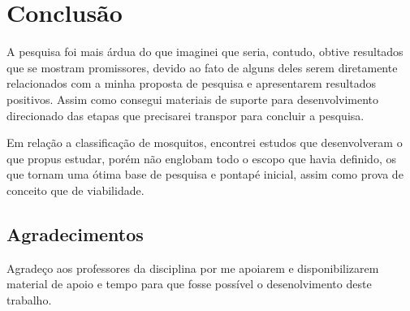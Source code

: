\documentclass{article}
\begin{document}
\section{Conclusão}
A pesquisa foi mais árdua do que imaginei que seria, contudo, obtive resultados que se mostram promissores, devido ao fato de alguns deles serem diretamente relacionados com a minha proposta de pesquisa e apresentarem resultados positivos. Assim como consegui materiais de suporte para desenvolvimento direcionado das etapas que precisarei transpor para concluir a pesquisa.

Em relação a classificação de mosquitos, encontrei estudos que desenvolveram o que propus estudar, porém não englobam todo o escopo que havia definido, os que tornam uma ótima base de pesquisa e pontapé inicial, assim como prova de conceito que de viabilidade. 

\subsection{Agradecimentos}
Agradeço aos professores da disciplina por me apoiarem e disponibilizarem material de apoio e tempo para que fosse possível o desenolvimento deste trabalho.






\end{document}
